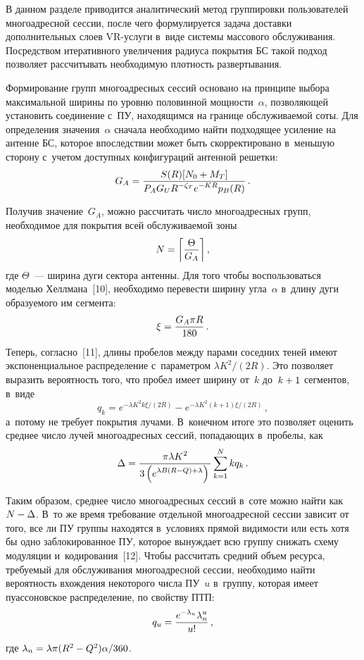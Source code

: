 \begin{multicols}{2}
\vspace*{-4pt}
  
  В данном разделе приводится аналитический метод группировки 
пользователей многоадресной сессии, после чего формулируется задача 
доставки дополнительных слоев VR-услу\-ги в~виде системы массового 
обслуживания. Посредством итеративного увеличения радиуса 
покрытия БС такой подход позволяет рассчитывать необходимую плот\-ность 
развертывания.
  
  Формирование групп многоадресных сессий основано на принципе выбора 
максимальной ширины по уровню половинной мощности~$\alpha$, 
позволяющей установить соединение с~ПУ, находящимся на границе 
обслуживаемой соты. Для определения значения~$\alpha$ сначала необходимо 
найти подходящее усиление на антенне БС, которое впоследствии может быть 
скорректировано в~меньшую сторону с~учетом доступных конфигураций 
антенной решетки:
  \begin{equation}
  G_A= \displaystyle\frac{\displaystyle S(R)[N_0+M_T]\mathstrut}{\displaystyle P_A G_U R^{-\zeta_T} e^{-KR} p_B(R)\mathstrut}\,.
  \label{e1-bes}
  \end{equation}
  
  Получив значение~$G_A$, можно рассчитать число многоадресных групп, 
необходимое для покрытия всей обслуживаемой зоны 
$$
N= \left\lceil \displaystyle\frac{\displaystyle \Theta\mathstrut}{\displaystyle G_A\mathstrut}\right\rceil,
$$
 где $\Theta$~--- ширина дуги сектора антенны. Для того 
чтобы воспользоваться моделью Хеллмана~[10], необходимо перевести ширину 
угла~$\alpha$ в~длину дуги образуемого им сегмента:
$$
\xi= \displaystyle\frac{\displaystyle G_A\pi R\mathstrut}{\displaystyle 180\mathstrut}\,.
$$ 
Теперь, согласно~[11], длины пробелов между парами соседних теней имеют 
экспоненциальное распределение с~параметром $\lambda K^2/(2R)$. Это 
позволяет выразить вероятность того, что пробел имеет ширину от~$k$ 
до~$k\hm+1$ сегментов, в~виде
  \begin{equation}
  q_k= e^{-\lambda K^2 k\xi/(2R)} - e^{-\lambda K^2(k+1)\xi/(2R)}\,,
  \label{e2-bes}
  \end{equation}
а~потому не требует покрытия лучами. В~конечном итоге это позволяет 
оценить среднее число лучей многоадресных сессий, попадающих в~пробелы, 
как
\begin{equation}
\Delta = \displaystyle\frac{\displaystyle \pi \lambda K^2\mathstrut}{\displaystyle 3\left(e^{\lambda B(R-
Q)+\lambda}\right)\mathstrut}\sum\limits^N_{k=1} kq_k\,.
\label{e3-bes}
\end{equation}
  
  Таким образом, среднее число многоадресных сессий в~соте можно найти как 
$N\hm- \Delta$. В~то же время требование отдельной многоадресной сессии 
зависит от того, все ли ПУ группы находятся в~условиях прямой видимости 
или есть хотя бы одно заблокированное ПУ, которое вынуждает всю группу 
снижать схему модуляции и~кодирования~[12]. Чтобы рассчитать средний 
объем ресурса, тре\-бу\-емый для обслуживания многоадресной сессии, необходимо найти 
вероятность вхождения некоторого чис\-ла ПУ~$u$ в~группу, которая имеет 
пуассоновское распределение, по свойству ПТП:
  \begin{equation}
  q_u= \displaystyle\frac{\displaystyle e^{-\lambda_n}\lambda_n^u\mathstrut}{\displaystyle u!\mathstrut}\,,
  \label{e4-bes}
  \end{equation}
где $\lambda_n= \lambda\pi (R^2\hm- Q^2)\alpha/360$.


\end{multicols}
